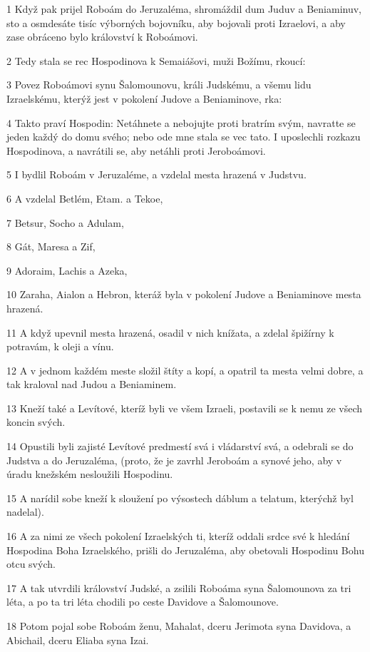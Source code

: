 \par 1 Když pak prijel Roboám do Jeruzaléma, shromáždil dum Juduv a Beniaminuv, sto a osmdesáte tisíc výborných bojovníku, aby bojovali proti Izraelovi, a aby zase obráceno bylo království k Roboámovi.
\par 2 Tedy stala se rec Hospodinova k Semaiášovi, muži Božímu, rkoucí:
\par 3 Povez Roboámovi synu Šalomounovu, králi Judskému, a všemu lidu Izraelskému, kterýž jest v pokolení Judove a Beniaminove, rka:
\par 4 Takto praví Hospodin: Netáhnete a nebojujte proti bratrím svým, navratte se jeden každý do domu svého; nebo ode mne stala se vec tato. I uposlechli rozkazu Hospodinova, a navrátili se, aby netáhli proti Jeroboámovi.
\par 5 I bydlil Roboám v Jeruzaléme, a vzdelal mesta hrazená v Judstvu.
\par 6 A vzdelal Betlém, Etam. a Tekoe,
\par 7 Betsur, Socho a Adulam,
\par 8 Gát, Maresa a Zif,
\par 9 Adoraim, Lachis a Azeka,
\par 10 Zaraha, Aialon a Hebron, kteráž byla v pokolení Judove a Beniaminove mesta hrazená.
\par 11 A když upevnil mesta hrazená, osadil v nich knížata, a zdelal špižírny k potravám, k oleji a vínu.
\par 12 A v jednom každém meste složil štíty a kopí, a opatril ta mesta velmi dobre, a tak kraloval nad Judou a Beniaminem.
\par 13 Kneží také a Levítové, kteríž byli ve všem Izraeli, postavili se k nemu ze všech koncin svých.
\par 14 Opustili byli zajisté Levítové predmestí svá i vládarství svá, a odebrali se do Judstva a do Jeruzaléma, (proto, že je zavrhl Jeroboám a synové jeho, aby v úradu knežském nesloužili Hospodinu.
\par 15 A narídil sobe kneží k sloužení po výsostech dáblum a telatum, kterýchž byl nadelal).
\par 16 A za nimi ze všech pokolení Izraelských ti, kteríž oddali srdce své k hledání Hospodina Boha Izraelského, prišli do Jeruzaléma, aby obetovali Hospodinu Bohu otcu svých.
\par 17 A tak utvrdili království Judské, a zsilili Roboáma syna Šalomounova za tri léta, a po ta tri léta chodili po ceste Davidove a Šalomounove.
\par 18 Potom pojal sobe Roboám ženu, Mahalat, dceru Jerimota syna Davidova, a Abichail, dceru Eliaba syna Izai.
